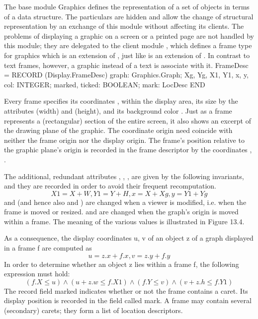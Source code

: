 The base module Graphics defines the representation of a set of objects in terms of a data structure. The particulars are hidden and allow the change of structural representation by an exchange of this module without affecting its clients. The problems of displaying a graphic on a screen or a printed page are not handled by this module; they are delegated to the client module , which defines a frame type for graphics which is an extension of , just like  is an extension of . In contrast to text frames, however, a graphic instead of a text is associate with it.
\begintt
FrameDesc = RECORD (Display.FrameDesc)
  graph: Graphics.Graph;
  Xg, Yg, X1, Y1, x, y, col: INTEGER;
  marked, ticked: BOOLEAN;
  mark: LocDesc
END
\endtt

Every frame specifies its coordinates ,  within the display area, its size by the attributes  (width) and  (height), and its background color . Just as a frame represents a (rectangular) section of the entire screen, it also shows an excerpt of the drawing plane of the graphic. The coordinate origin need coincide with neither the frame origin nor the display origin. The frame's position relative to the graphic plane's origin is recorded in the frame descriptor by the coordinates , .

The additional, redundant attributes , , ,  are given by the following invariants, and they are recorded in order to avoid their frequent recomputation.
$$X1 = X+W, Y1 = Y+H, x = X+Xg, y = Y1+Yg$$
 and  (and hence also  and ) are changed when a viewer is modified, i.e. when the frame is moved or resized.  and  are changed when the graph's origin is moved within a frame. The meaning of the various values is illustrated in Figure 13.4.


As a consequence, the display coordinates u, v of an object z of a graph displayed in a frame f are computed as
$$u = z.x + f.x, v = z.y + f.y$$
In order to determine whether an object z lies within a frame f, the following expression must hold:
$$(f.X \le u) \land (u + z.w \le f.X1) \land (f.Y \le v) \land (v + z.h \le f.Y1)$$
The record field marked indicates whether or not the frame contains a caret. Its display position is recorded in the field called mark. A frame may contain several (secondary) carets; they form a list of location descriptors.

